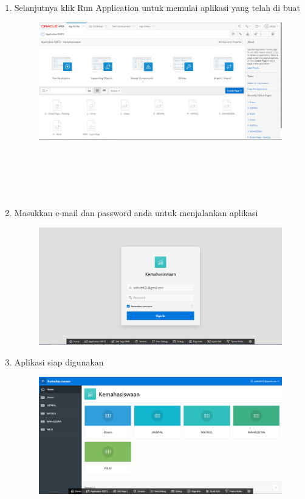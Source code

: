 \documentclass[12pt, times new roman, a4paper]{article}
\begin{document}
\begin{enumerate}
\item Selanjutnya klik Run Application untuk memulai aplikasi yang telah di buat
\begin{figure} [h]
	\centering
		\includegraphics[scale=0.4]{gambar/20}
\end{figure}
\\
\\
\\
\\
\item Masukkan e-mail dan password anda untuk menjalankan aplikasi 
\begin{figure} [h]
	\centering
		\includegraphics[scale=0.4]{gambar/21}
\end{figure}

\item Aplikasi siap digunakan
\begin{figure} [h]
	\centering
		\includegraphics[scale=0.4]{gambar/22}
\end{figure}

\end{enumerate}
\end{document}
